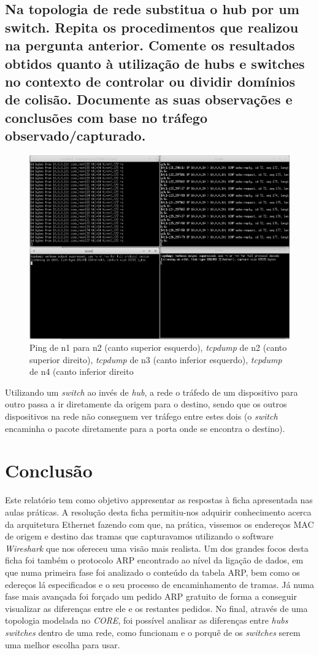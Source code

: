 \documentclass[a4paper]{article}
\begin{document}
\subsection{Na topologia de rede substitua o hub por um switch. Repita os procedimentos que realizou na pergunta anterior. Comente os resultados obtidos quanto à utilização de hubs e switches no contexto de controlar ou dividir domínios de colisão. Documente as suas observações e conclusões com base no tráfego observado/capturado.}
\begin{figure}[H]
\centering
\includegraphics[scale=0.40]{pics/p18.png}
\caption{Ping de n1 para n2 (canto superior esquerdo), \textit{tcpdump} de n2 (canto superior direito), \textit{tcpdump} de n3 (canto inferior esquerdo), \textit{tcpdump} de n4 (canto inferior direito} %
\end{figure}
Utilizando um \textit{switch} ao invés de \textit{hub}, a rede o tráfedo de um dispositivo para outro passa a ir diretamente da origem para o destino, sendo que os outros dispositivos na rede não conseguem ver tráfego entre estes dois (o \textit{switch} encaminha o pacote diretamente para a porta onde se encontra o destino).

\section{Conclusão}
Este relatório tem como objetivo appresentar as respostas à ficha apresentada nas aulas práticas. A resolução desta ficha permitiu-nos adquirir conhecimento acerca da arquitetura Ethernet fazendo com que, na prática, vissemos os endereços MAC de origem e destino das tramas que capturavamos utilizando o software \textit{Wireshark} que nos ofereceu uma visão mais realista. Um dos grandes focos desta ficha foi também o protocolo ARP encontrado ao nível da ligação de dados, em que numa primeira fase foi analizado o conteúdo da tabela ARP, bem como os edereços lá especificados e o seu processo de encaminhamento de tramas. Já numa fase mais avançada foi forçado um pedido ARP gratuito de forma a conseguir visualizar as diferenças entre ele e os restantes pedidos. No final, através de uma topologia modelada no \textit{CORE}, foi possível analisar as diferenças entre \textit{hubs} \textit{switches} dentro de uma rede, como funcionam e o porquê de os \textit{switches} serem uma melhor escolha para usar.
\end{document}
